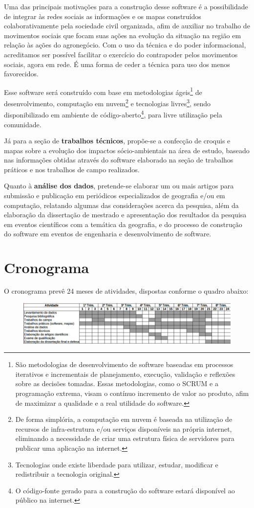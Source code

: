 Uma das principais motivações para a construção desse software é a possibilidade de integrar às redes sociais as informações e os mapas construídos colaborativamente pela sociedade civil organizada, afim de auxiliar no trabalho de movimentos sociais que focam suas ações na evolução da situação na região em relação às ações do agronegócio. Com o uso da técnica e do poder informacional, acreditamos ser possível facilitar o exercício do contrapoder pelos movimentos sociais, agora em rede. É uma forma de ceder a técnica para uso dos menos favorecidos.

Esse software será construído com base em metodologias ágeis\footnote{São metodologias de desenvolvimento de software baseadas em processos iterativos e incrementais de planejamento, execução, validação e reflexões sobre as decisões tomadas. Essas metodologias, como o SCRUM e a programação extrema, visam o contínuo incremento de valor ao produto, afim de maximizar a qualidade e a real utilidade do software.} de desenvolvimento, computação em nuvem\footnote{De forma simplória, a computação em nuvem é baseada na utilização de recursos de infra-estrutura e/ou serviços disponíveis na própria internet, eliminando a necessidade de criar uma estrutura física de servidores para publicar uma aplicação na internet.} e tecnologias livres\footnote{Tecnologias onde existe liberdade para utilizar, estudar, modificar e redistribuir a tecnologia original.}, sendo disponibilizado em ambiente de código-aberto\footnote{O código-fonte gerado para a construção do software estará disponível ao público na internet.}, para livre utilização pela comunidade.

Já para a seção de \textbf{trabalhos técnicos}, propõe-se a confecção de croquis e mapas sobre a evolução dos impactos sócio-ambientais na área de estudo, baseado nas informações obtidas através do software elaborado na seção de trabalhos práticos e nos trabalhos de campo realizados.

Quanto à \textbf{análise dos dados}, pretende-se elaborar um ou mais artigos para submissão e publicação em periódicos especializados de geografia e/ou em computação, relatando algumas das considerações acerca da pesquisa, além da elaboração da dissertação de mestrado e apresentação dos resultados da pesquisa em eventos científicos com a temática da geografia, e do processo de construção do software em eventos de engenharia e desenvolvimento de software.

\section{Cronograma}

O cronograma prevê 24 meses de atividades, dispostas conforme o quadro abaixo:

\begin{figure}[htb]
\begin{center}
    \includegraphics[scale=0.4]{crono.png}
\end{center}
\end{figure}

